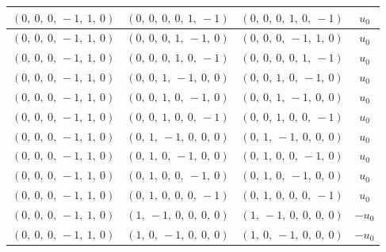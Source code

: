 \documentclass[11pt]{article}
\theoremstyle{definition}
\begin{document}
\begin{longtable}{|l|l|l|c|}
    \hline
    $\left( 0, \  0, \  0, \  -1, \  1, \  0\right)$ & $\left( 0, \  0, \  0, \  0, \  1, \  -1\right)$ & $\left( 0, \  0, \  0, \  1, \  0, \  -1\right)$ & $u_{0}$ \\
    \hline
    $\left( 0, \  0, \  0, \  -1, \  1, \  0\right)$ & $\left( 0, \  0, \  0, \  1, \  -1, \  0\right)$ & $\left( 0, \  0, \  0, \  -1, \  1, \  0\right)$ & $u_{0}$ \\
    \hline
    $\left( 0, \  0, \  0, \  -1, \  1, \  0\right)$ & $\left( 0, \  0, \  0, \  1, \  0, \  -1\right)$ & $\left( 0, \  0, \  0, \  0, \  1, \  -1\right)$ & $u_{0}$ \\
    \hline
    $\left( 0, \  0, \  0, \  -1, \  1, \  0\right)$ & $\left( 0, \  0, \  1, \  -1, \  0, \  0\right)$ & $\left( 0, \  0, \  1, \  0, \  -1, \  0\right)$ & $u_{0}$ \\
    \hline
    $\left( 0, \  0, \  0, \  -1, \  1, \  0\right)$ & $\left( 0, \  0, \  1, \  0, \  -1, \  0\right)$ & $\left( 0, \  0, \  1, \  -1, \  0, \  0\right)$ & $u_{0}$ \\
    \hline
    $\left( 0, \  0, \  0, \  -1, \  1, \  0\right)$ & $\left( 0, \  0, \  1, \  0, \  0, \  -1\right)$ & $\left( 0, \  0, \  1, \  0, \  0, \  -1\right)$ & $u_{0}$ \\
    \hline
    $\left( 0, \  0, \  0, \  -1, \  1, \  0\right)$ & $\left( 0, \  1, \  -1, \  0, \  0, \  0\right)$ & $\left( 0, \  1, \  -1, \  0, \  0, \  0\right)$ & $u_{0}$ \\
    \hline
    $\left( 0, \  0, \  0, \  -1, \  1, \  0\right)$ & $\left( 0, \  1, \  0, \  -1, \  0, \  0\right)$ & $\left( 0, \  1, \  0, \  0, \  -1, \  0\right)$ & $u_{0}$ \\
    \hline
    $\left( 0, \  0, \  0, \  -1, \  1, \  0\right)$ & $\left( 0, \  1, \  0, \  0, \  -1, \  0\right)$ & $\left( 0, \  1, \  0, \  -1, \  0, \  0\right)$ & $u_{0}$ \\
    \hline
    $\left( 0, \  0, \  0, \  -1, \  1, \  0\right)$ & $\left( 0, \  1, \  0, \  0, \  0, \  -1\right)$ & $\left( 0, \  1, \  0, \  0, \  0, \  -1\right)$ & $u_{0}$ \\
    \hline
    $\left( 0, \  0, \  0, \  -1, \  1, \  0\right)$ & $\left( 1, \  -1, \  0, \  0, \  0, \  0\right)$ & $\left( 1, \  -1, \  0, \  0, \  0, \  0\right)$ & $- u_{0}$ \\
    \hline
    $\left( 0, \  0, \  0, \  -1, \  1, \  0\right)$ & $\left( 1, \  0, \  -1, \  0, \  0, \  0\right)$ & $\left( 1, \  0, \  -1, \  0, \  0, \  0\right)$ & $- u_{0}$ \\

\end{longtable}
\end{document}
